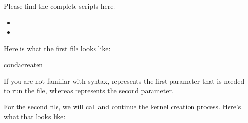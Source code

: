 \documentclass[letterpaper,12pt,english]{sphinxmanual}
\begin{document}
\sphinxAtStartPar
Please find the complete scripts here:
\begin{itemize}
\item {} 
\sphinxAtStartPar
{}

\item {} 
\sphinxAtStartPar
{}

\end{itemize}

\sphinxAtStartPar
Here is what the first file looks like:

\begin{sphinxVerbatim}[commandchars=\\\{\}]
condacreate\PYGZhy{}n
\end{sphinxVerbatim}

\sphinxAtStartPar
If you are not familiar with  syntax,  represents the first parameter that is needed to run the file, whereas  represents the second parameter.

\sphinxAtStartPar
For the second file, we will call  and continue the kernel creation process. Here’s what that looks like:
\end{document}
